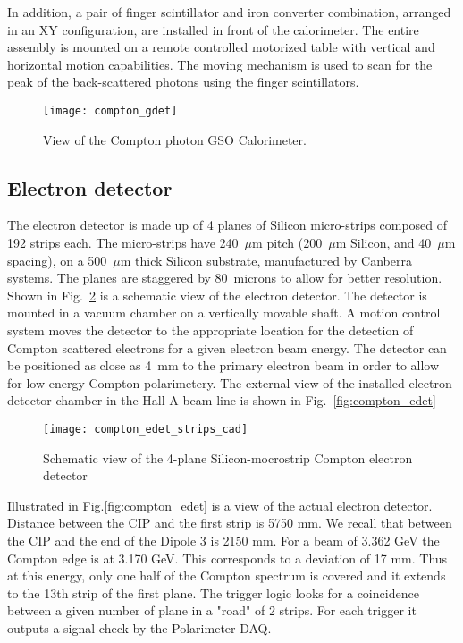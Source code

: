 {In addition, a pair of finger scintillator and iron converter combination, arranged in an XY configuration, are installed in front
of the calorimeter. The entire assembly is mounted on a remote controlled motorized  table with vertical and horizontal motion
capabilities. The moving  mechanism is used to scan for the peak of the back-scattered photons using the finger scintillators.

\begin{figure}[htp]
    \begin{center}
        \texttt{[image: compton\_gdet]}
    \end{center}
    \caption[compton:photon detector]{
            View of the Compton photon GSO Calorimeter.}
    \label{fig:compton_gdet}
 \end{figure}


\subsection{Electron detector}
\label{sec:compton_edet}

The electron detector is made up of 4 planes of Silicon micro-strips composed
of 192 strips each. The micro-strips have 240~$\mu$m pitch (200~$\mu$m Silicon, and 40~$\mu$m spacing), on a  500~$\mu$m 
thick Silicon substrate, manufactured by Canberra systems. The planes are staggered by 80~microns to allow for better
resolution. Shown in Fig.~\ref{fig:compton_edet_strips_cad} is a schematic view of the electron detector. The detector is mounted  in a vacuum chamber on  a vertically movable shaft. A motion control system moves the detector to the appropriate location for the detection of Compton scattered electrons for a given electron beam energy. The detector can be positioned as close as 4~mm to the primary electron beam in order to allow for low energy Compton polarimetery. The external view of the installed electron detector chamber in the Hall A beam line is shown in  Fig.~\ref{fig:compton_edet} 


\begin{figure}[htp]
    \begin{center}
        \texttt{[image: compton\_edet\_strips\_cad]}
    \end{center}
    \caption[compton:electron detector]{Schematic view of the 4-plane Silicon-mocrostrip Compton electron detector}
    \label{fig:compton_edet_strips_cad}
 \end{figure}


 Illustrated in Fig.\ref{fig:compton_edet} is a view of the actual electron detector.
Distance between the CIP and the first strip is 5750 mm. We recall that
between the CIP and the end of the Dipole 3 is 2150 mm.
For a beam of 3.362 GeV the Compton
edge is at 3.170 GeV. This corresponds to a deviation of 17 mm. Thus at
this energy, only one half of the Compton spectrum is covered and it extends
to the 13th strip of the first plane. The trigger logic looks for a coincidence
between a given number of plane in a "road" of 2 strips. For each trigger
it outputs a signal check by the Polarimeter DAQ.


}
